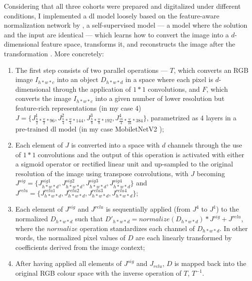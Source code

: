 Considering that all three cohorts were prepared and digitalized under different conditions, I implemented a \ac{dl} model loosely based on the feature-aware normalization network by , a self-supervised model --- a model where the solution and the input are identical --- which learns how to convert the image into a $d$-dimensional feature space, transforms it, and reconstructs the image after the transformation \cite{Bug2017-kk}. More concretely:

\begin{enumerate}
    \item The first step consists of two parallel operations --- $T$, which converts an RGB image $I_{h*w*c}$ into an object $D_{h*w*d}$ in a space where each pixel is $d$-dimensional through the application of $1*1$ convolutions, and $F$, which converts the image $I_{h*w*c}$ into a given number of lower resolution but feature-rich representations (in my case 4) $J = \{J_{\frac{h}{2}*\frac{w}{2}*96}^1,J_{\frac{h}{4}*\frac{w}{4}*144}^2,J_{\frac{h}{8}*\frac{w}{8}*192}^3,J_{\frac{16}{4}*\frac{w}{16}*384}^4\}$, parametrized as 4 layers in a pre-trained \ac{dl} model (in my case MobiletNetV2 \cite{Sandler2018-bd});
    \item Each element of $J$ is converted into a space with $d$ channels through the use of $1*1$ convolutions and the output of this operation is activated with either a sigmoid operator or rectified linear unit and up-sampled to the original resolution of the image using transpose convolutions, with $J$ becoming $J^{sig} = \{J_{h*w*d}^{sig1},J_{h*w*d}^{sig2},J_{h*w*d}^{sig3},J_{h*w*d}^{sig4}\}$ and $J^{relu} = \{J_{h*w*d}^{relu1},J_{h*w*d}^{relu2},J_{h*w*d}^{relu3},J_{h*w*d}^{relu4}\}$;
    \item Each element of $J^{sig}$ and $J^{relu}$ is sequentially applied (from $J^4$ to $J^1$) to the normalized $D_{h*w*d}$ such that $D'_{h*w*d} = normalize(D_{h*w*d}) * J^{sig} + J^{relu}$, where the $normalize$ operation standardizes each channel of $D_{h*w*d}$. In other words, the normalized pixel values of $D$ are each linearly transformed by coefficients derived from the image context; 
    \item After having applied all elements of $J^{sig}$ and $J_{relu}$, $D$ is mapped back into the original RGB colour space with the inverse operation of $T$, $T^{-1}$.
\end{enumerate}

